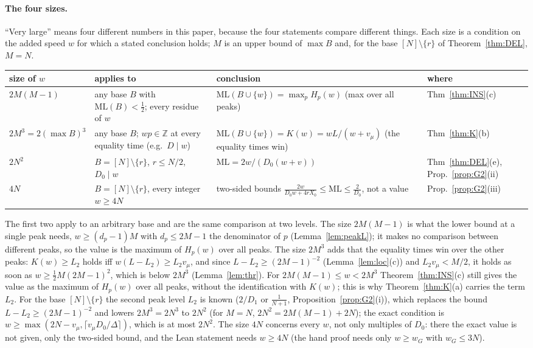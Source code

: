 \documentclass[11pt]{article}
\theoremstyle{definition}
\theoremstyle{remark}
\newcommand{\ML}{\mathrm{ML}}
\newcommand{\ZZ}{\mathbb{Z}}
\begin{document}
\paragraph{The four sizes.}
``Very large'' means four different numbers in this paper, because the four statements compare different things. Each size is a condition on the added speed $w$ for which a stated conclusion holds; $M$ is an upper bound of $\max B$ and, for the base $[N]\setminus\{r\}$ of Theorem~\ref{thm:DEL}, $M=N$.
\begin{center}
\small
\begin{tabular}{l p{} p{} p{}}
\toprule
size of $w$ & applies to & conclusion & where \\
\midrule
$2M(M-1)$ & any base $B$ with $\ML(B)<\frac12$; every residue of $w$ & $\ML(B\cup\{w\})=\max_pH_p(w)$ (max over all peaks) & Thm~\ref{thm:INS}(c) \\
$2M^3=2(\max B)^3$ & any base $B$; $wp\in\ZZ$ at every equality time (e.g.\ $D\mid w$) & $\ML(B\cup\{w\})=K(w)=wL/(w+v_\mu)$ (the equality times win) & Thm~\ref{thm:K}(b) \\
$2N^2$ & $B=[N]\setminus\{r\}$, $r\le N/2$, $D_0\mid w$ & $\ML=2w/(D_0(w+v))$ & Thm~\ref{thm:DEL}(e), Prop.~\ref{prop:G2}(ii) \\
$4N$ & $B=[N]\setminus\{r\}$, every integer $w\ge4N$ & two-sided bounds $\frac{2w}{D_0w+4rX_0}\le\ML\le\frac2{D_0}$, not a value & Prop.~\ref{prop:G2}(iii) \\
\bottomrule
\end{tabular}
\end{center}
The first two apply to an arbitrary base and are the same comparison at two levels. The size $2M(M-1)$ is what the lower bound at a single peak needs, $w\ge(d_p-1)M$ with $d_p\le2M-1$ the denominator of $p$ (Lemma~\ref{lem:peakL}); it makes no comparison between different peaks, so the value is the maximum of $H_p(w)$ over all peaks. The size $2M^3$ adds that the equality times win over the other peaks: $K(w)\ge L_2$ holds iff $w(L-L_2)\ge L_2v_\mu$, and since $L-L_2\ge(2M-1)^{-2}$ (Lemma~\ref{lem:loc}(c)) and $L_2v_\mu<M/2$, it holds as soon as $w\ge\frac12M(2M-1)^2$, which is below $2M^3$ (Lemma~\ref{lem:thr}). For $2M(M-1)\le w<2M^3$ Theorem~\ref{thm:INS}(c) still gives the value as the maximum of $H_p(w)$ over all peaks, without the identification with $K(w)$; this is why Theorem~\ref{thm:K}(a) carries the term $L_2$. For the base $[N]\setminus\{r\}$ the second peak level $L_2$ is known ($2/D_1$ or $\frac1{N+1}$, Proposition~\ref{prop:G2}(i)), which replaces the bound $L-L_2\ge(2M-1)^{-2}$ and lowers $2M^3=2N^3$ to $2N^2$ (for $M=N$, $2N^2=2M(M-1)+2N$); the exact condition is $w\ge\max(2N-v_\mu,\lceil v_\mu D_0/\Delta\rceil)$, which is at most $2N^2$. The size $4N$ concerns every $w$, not only multiples of $D_0$: there the exact value is not given, only the two-sided bound, and the Lean statement needs $w\ge4N$ (the hand proof needs only $w\ge w_G$ with $w_G\le3N$).
\end{document}
